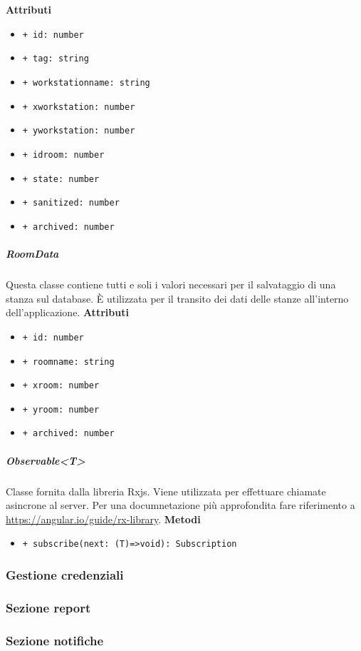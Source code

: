 \textbf{Attributi}
\begin{itemize}
	\item \texttt{+ id: number 	}
	\item \texttt{+ tag: string 	}
	\item \texttt{+ workstationname: string 	}
	\item \texttt{+ xworkstation: number 	}
	\item \texttt{+ yworkstation: number 	}
	\item \texttt{+ idroom: number 	}
	\item \texttt{+ state: number 	}
	\item \texttt{+ sanitized: number 	}
	\item \texttt{+ archived: number}
\end{itemize}
\subparagraph{RoomData}
Questa classe contiene tutti e soli i valori necessari per il salvataggio di una stanza sul database. È utilizzata per il transito dei dati delle stanze all'interno dell'applicazione.
\textbf{Attributi}
\begin{itemize}
	\item \texttt{+ id: number 	}
	\item \texttt{+ roomname: string 	}
	\item \texttt{+ xroom: number 	}
	\item \texttt{+ yroom: number 	}
	\item \texttt{+ archived: number}
\end{itemize}
\subparagraph{Observable<T>}
Classe fornita dalla libreria Rxjs. Viene utilizzata per effettuare chiamate asincrone al server. Per una documnetazione più approfondita fare riferimento a \url{https://angular.io/guide/rx-library}.
\textbf{Metodi}
\begin{itemize}
	\item \texttt{+ subscribe(next: (T)=>void): Subscription}
\end{itemize}

\subsubsection{Gestione credenziali}
\subsubsection{Sezione report}
\subsubsection{Sezione notifiche}

